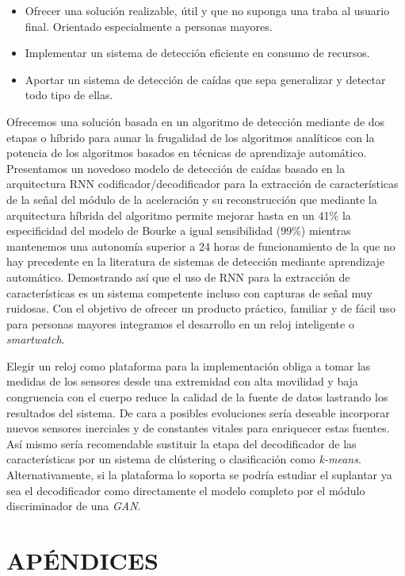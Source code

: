 \documentclass[11pt,a4paper,spanish,twocolumn]{article}
\begin{document}
\begin{itemize}
	\item Ofrecer una solución realizable, útil y que no suponga una traba al usuario final. Orientado especialmente a personas mayores.
	\item Implementar un sistema de detección eficiente en consumo de recursos.
	\item Aportar un sistema de detección de caídas que sepa generalizar y detectar todo tipo de ellas.
\end{itemize}

Ofrecemos una solución basada en un algoritmo de detección mediante de dos etapas o híbrido para aunar la frugalidad de los algoritmos analíticos con la potencia de los algoritmos basados en técnicas de aprendizaje automático. Presentamos un novedoso modelo de detección de caídas basado en la arquitectura RNN codificador/decodificador para la extracción de características de la señal del módulo de la aceleración y su reconstrucción que mediante la arquitectura híbrida del algoritmo permite mejorar hasta en un 41\% la especificidad del modelo de Bourke a igual sensibilidad (99\%) mientras mantenemos una autonomía superior a 24 horas de funcionamiento de la que no hay precedente en la literatura de sistemas de detección mediante aprendizaje automático. Demostrando así que el uso de RNN para la extracción de características es un sistema competente incluso con capturas de señal muy ruidosas. Con el objetivo de ofrecer un producto práctico, familiar y de fácil uso para personas mayores integramos el desarrollo en un reloj inteligente o \textit{smartwatch}.


Elegir un reloj  como plataforma para la implementación obliga a tomar las medidas de los sensores desde una extremidad con alta movilidad y baja congruencia con el cuerpo reduce la calidad de la fuente de datos lastrando los resultados del sistema. De cara a posibles evoluciones sería deseable incorporar nuevos sensores inerciales y de constantes vitales para enriquecer estas fuentes. Así mismo sería recomendable sustituir la etapa del decodificador de las características por un sistema de clústering o clasificación como \textit{k-means}. Alternativamente, si la plataforma lo soporta se podría estudiar el suplantar ya sea el decodificador como directamente el modelo completo por el módulo discriminador de una \textit{GAN}.

\appendix
\section{APÉNDICES}



\end{document}
